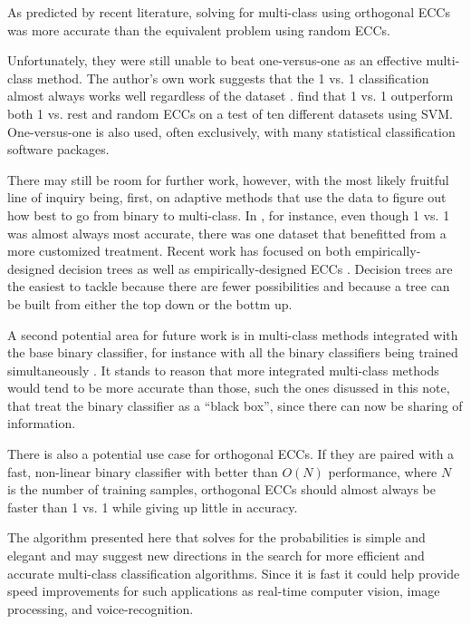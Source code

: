 As predicted by recent literature, solving for multi-class using orthogonal ECCs was more accurate than the equivalent problem using random ECCs.
{\revision
Unfortunately, they were still unable to beat one-versus-one as an
effective multi-class method.
The author's own work suggests that the 1 vs. 1 classification almost always
works well regardless of the dataset \citep{Mills2018a}.
\citet{Hsu_Lin2002} find that 1 vs. 1 outperform both 1 vs. rest and random ECCs on a test
of ten different datasets using SVM.
One-versus-one is also used, often exclusively, with many statistical classification software packages.

There may still be room for further work, however, with the most likely fruitful
line of inquiry being, first,
on adaptive methods that use the data to figure out how best to go
from binary to multi-class.
In \citet{Mills2018a}, for instance, even though 1 vs. 1 was almost always
most accurate, there was one dataset that benefitted from a more
customized treatment.
Recent work has focused on both empirically-designed decision trees 
\citep{Cheong_etal2004,Lee_Oh2003,Benabdeslem_Bennani2006}
as well as empirically-designed ECCs 
\citep{Crammer_Singer2002,Zhou_etal2008,Zhong_Cheriet2013}.
Decision trees are the easiest to tackle because there are fewer possibilities
and because a tree can be built from either the top down or the bottm up.

A second potential area for future work is in multi-class methods integrated
with the base binary classifier, for instance with all the binary classifiers
being trained simultaneously \citep{Hsu_Lin2002}.
It stands to reason that more integrated multi-class methods would tend to
be more accurate than those, such the ones disussed in this note, that treat the
binary classifier as a ``black box'', since there can now be sharing of
information.

There is also a potential use case for orthogonal ECCs. 
If they are paired with a fast, non-linear binary classifier
with better than $O(N)$ performance, where $N$ is the number of training
samples,
orthogonal ECCs should almost always be faster than 1 vs. 1
while giving up little in accuracy.}
The algorithm presented here that solves for the probabilities is simple and elegant and
may suggest new directions in the search for more efficient and
accurate multi-class classification algorithms.
{\revision
Since it is fast it could help provide speed
improvements for such applications as real-time computer vision,
image processing, and voice-recognition.}

